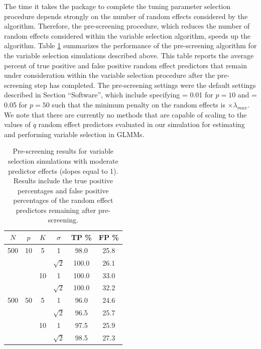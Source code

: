 The time it takes the package to complete the tuning parameter selection procedure
depends strongly on the number of random effects considered by the
algorithm. Therefore, the pre-screening procedure, which reduces the
number of random effects considered within the variable selection
algorithm, speeds up the algorithm. 
Table \ref{tab:prescB1} summarizes the performance of the pre-screening algorithm for the variable selection simulations described above. This table reports the average percent of true positive and false positive random effect predictors that remain under consideration within the variable selection procedure after the pre-screening step has completed.
The pre-screening settings were the default settings described in Section ``Software'', which include specifying  = 0.01 for $p=10$ and  = 0.05 for $p=50$ such that the minimum penalty on the random effects is  $\times\lambda_{max}$. 
We note that there are currently no methods that are capable of scaling to the values of $q$ random effect predictors evaluated in our simulation for estimating and performing variable selection in GLMMs. 

\begin{table}[h!]

\centering
\begin{tabular}{cccccc}
  \toprule
   $N$ & $p$ & $K$ & $\sigma$  & TP \% & FP \% \\ 
  \midrule
  500 & 10 & 5  & 1         & 98.0 & 25.8 \\ 
      &    &    & $\sqrt{2}$ & 100.0 & 26.1 \\ 
      &    & 10 & 1         & 100.0 & 33.0 \\ 
      &    &    & $\sqrt{2}$  & 100.0 & 32.2 \\ 
  \midrule
  500 & 50 & 5  & 1         & 96.0 & 24.6 \\
      &    &    & $\sqrt{2}$  & 96.5 & 25.7 \\
      &    & 10 & 1         & 97.5 & 25.9 \\
      &    &    & $\sqrt{2}$  & 98.5 & 27.3 \\
   \bottomrule
\end{tabular}
\caption{Pre-screening results for variable selection simulations with moderate predictor effects (slopes equal to 1). Results include the true positive percentages and false positive percentages of the random effect predictors remaining after pre-screening.}
\label{tab:prescB1}
\end{table}

